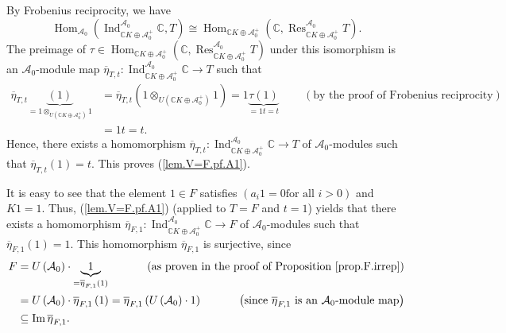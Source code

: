 \documentclass[etingof-lie.tex]{subfiles}
\begin{document}
By Frobenius reciprocity, we have%
\[
\operatorname*{Hom}\nolimits_{\mathcal{A}_{0}}\left(  \operatorname*{Ind}%
\nolimits_{\mathbb{C}K\oplus\mathcal{A}_{0}^{+}}^{\mathcal{A}_{0}}%
\mathbb{C},T\right)  \cong\operatorname*{Hom}\nolimits_{\mathbb{C}%
K\oplus\mathcal{A}_{0}^{+}}\left(  \mathbb{C},\operatorname*{Res}%
\nolimits_{\mathbb{C}K\oplus\mathcal{A}_{0}^{+}}^{\mathcal{A}_{0}}T\right)  .
\]
The preimage of $\tau\in\operatorname*{Hom}\nolimits_{\mathbb{C}%
K\oplus\mathcal{A}_{0}^{+}}\left(  \mathbb{C},\operatorname*{Res}%
\nolimits_{\mathbb{C}K\oplus\mathcal{A}_{0}^{+}}^{\mathcal{A}_{0}}T\right)  $
under this isomorphism is an $\mathcal{A}_{0}$-module map $\overline{\eta
}_{T,t}:\operatorname*{Ind}\nolimits_{\mathbb{C}K\oplus\mathcal{A}_{0}^{+}%
}^{\mathcal{A}_{0}}\mathbb{C}\rightarrow T$ such that
\begin{align*}
\overline{\eta}_{T,t}\underbrace{\left(  1\right)  }_{=1\otimes_{U\left(
\mathbb{C}K\oplus\mathcal{A}_{0}^{+}\right)  }1}  &  =\overline{\eta}%
_{T,t}\left(  1\otimes_{U\left(  \mathbb{C}K\oplus\mathcal{A}_{0}^{+}\right)
}1\right)  =1\underbrace{\tau\left(  1\right)  }_{=1t=t}%
\ \ \ \ \ \ \ \ \ \ \left(  \text{by the proof of Frobenius reciprocity}%
\right) \\
&  =1t=t.
\end{align*}
Hence, there exists a homomorphism $\overline{\eta}_{T,t}:\operatorname*{Ind}%
\nolimits_{\mathbb{C}K\oplus\mathcal{A}_{0}^{+}}^{\mathcal{A}_{0}}%
\mathbb{C}\rightarrow T$ of $\mathcal{A}_{0}$-modules such that $\overline
{\eta}_{T,t}\left(  1\right)  =t$. This proves (\ref{lem.V=F.pf.A1}).

It is easy to see that the element $1\in F$ satisfies $\left(  a_{i}1=0\text{
for all }i>0\right)  $ and $K1=1$. Thus, (\ref{lem.V=F.pf.A1}) (applied to
$T=F$ and $t=1$) yields that there exists a homomorphism $\overline{\eta
}_{F,1}:\operatorname*{Ind}\nolimits_{\mathbb{C}K\oplus\mathcal{A}_{0}^{+}%
}^{\mathcal{A}_{0}}\mathbb{C}\rightarrow F$ of $\mathcal{A}_{0}$-modules such
that $\overline{\eta}_{F,1}\left(  1\right)  =1$. This homomorphism
$\overline{\eta}_{F,1}$ is surjective, since
\begin{align*}
F  &  =U\left(  \mathcal{A}_{0}\right)  \cdot\underbrace{1}_{=\overline{\eta
}_{F,1}\left(  1\right)  }\ \ \ \ \ \ \ \ \ \ \left(  \text{as proven in the
proof of Proposition \ref{prop.F.irrep}}\right) \\
&  =U\left(  \mathcal{A}_{0}\right)  \cdot\overline{\eta}_{F,1}\left(
1\right)  =\overline{\eta}_{F,1}\left(  U\left(  \mathcal{A}_{0}\right)
\cdot1\right)  \ \ \ \ \ \ \ \ \ \ \left(  \text{since }\overline{\eta}%
_{F,1}\text{ is an }\mathcal{A}_{0}\text{-module map}\right) \\
&  \subseteq\operatorname{Im}\overline{\eta}_{F,1}.
\end{align*}
\end{document}

